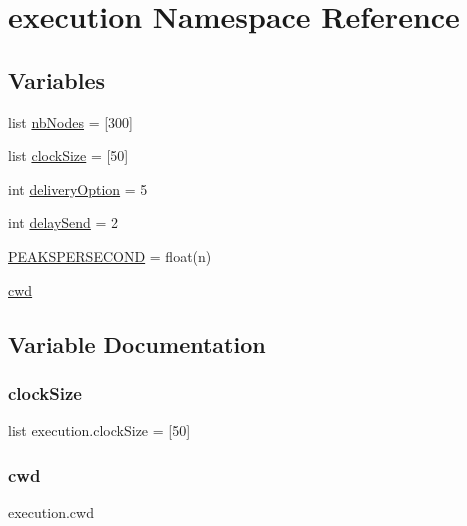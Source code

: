 \hypertarget{namespaceexecution}{}\section{execution Namespace Reference}
\label{namespaceexecution}
\subsection*{Variables}
\begin{DoxyCompactItemize}
\item 
list \hyperlink{namespaceexecution_a9322d266c2ecdaf443953ed2b1e9e3a0}{nb\+Nodes} = \mbox{[}300\mbox{]}
\item 
list \hyperlink{namespaceexecution_ab3dbc7a9f9785e14fa1471beef37fc2e}{clock\+Size} = \mbox{[}50\mbox{]}
\item 
int \hyperlink{namespaceexecution_a75347344fadcdbeb966f666398ee57d1}{delivery\+Option} = 5
\item 
int \hyperlink{namespaceexecution_a4debbecd09bc64b47a36feacb147f82c}{delay\+Send} = 2
\item 
\hyperlink{namespaceexecution_a1bd3eb0a7a83b035cbcd70b669aa04ab}{P\+E\+A\+K\+S\+P\+E\+R\+S\+E\+C\+O\+ND} = float(n)
\item 
\hyperlink{namespaceexecution_a6262f188785a4f21dbb96225d57388a8}{cwd}
\end{DoxyCompactItemize}


\subsection{Variable Documentation}
\mbox{\label{namespaceexecution_ab3dbc7a9f9785e14fa1471beef37fc2e}} 
\subsubsection{\texorpdfstring{clock\+Size}{clockSize}}
{\footnotesize\ttfamily list execution.\+clock\+Size = \mbox{[}50\mbox{]}}

\mbox{\label{namespaceexecution_a6262f188785a4f21dbb96225d57388a8}} 
\subsubsection{\texorpdfstring{cwd}{cwd}}
{\footnotesize\ttfamily execution.\+cwd}

